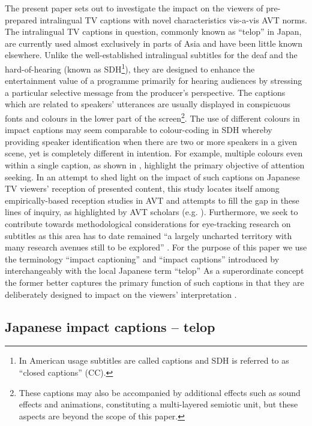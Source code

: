 \documentclass[output=paper]{langsci/langscibook}
\begin{document}
The present paper sets out to investigate the impact on the viewers of pre-prepared intralingual TV captions with novel characteristics vis-a-vis AVT norms. The intralingual TV captions in question, commonly known as ``telop'' in Japan, are currently used almost exclusively in parts of Asia and have been little known elsewhere.  Unlike the well-established intralingual subtitles for the deaf and the hard-of-hearing (known as SDH\footnote{In American usage subtitles are called captions and SDH is referred to as ``closed captions'' (CC).}), they are designed to enhance the entertainment value of a programme primarily for hearing audiences by stressing a particular selective message from the producer's perspective. The captions which are related to speakers' utterances are usually displayed in conspicuous fonts and colours in the lower part of the screen\footnote{ These captions may also be accompanied by additional effects such as sound effects and animations, constituting a multi-layered semiotic unit, but these aspects are beyond the scope of this paper.}. The use of different colours in impact captions may seem comparable to colour-coding in SDH whereby providing speaker identification when there are two or more speakers in a given scene, yet is completely different in intention. For example, multiple colours even within a single caption, as shown in , highlight the primary objective of attention seeking. In an attempt to shed light on the impact of such captions on Japanese TV viewers' reception of presented content, this study locates itself among empirically-based reception studies in AVT and attempts to fill the gap in these lines of inquiry, as highlighted by AVT scholars (e.g. \citealt{gambier2013}). Furthermore, we seek to contribute towards methodological considerations for eye-tracking research on subtitles as this area has to date remained ``a largely uncharted territory with many research avenues still to be explored'' \citep[n.p.]{Kruger2015}.  For the purpose of this paper we use the terminology ``impact captioning'' and ``impact captions'' introduced by \citet{Park2009} interchangeably with the local Japanese term ``telop'' As a superordinate concept the former better captures the primary function of such captions in that they are deliberately designed to impact on the viewers' interpretation \citep{Shiota2003}.

\subsection{Japanese impact captions -- telop}
\end{document}
